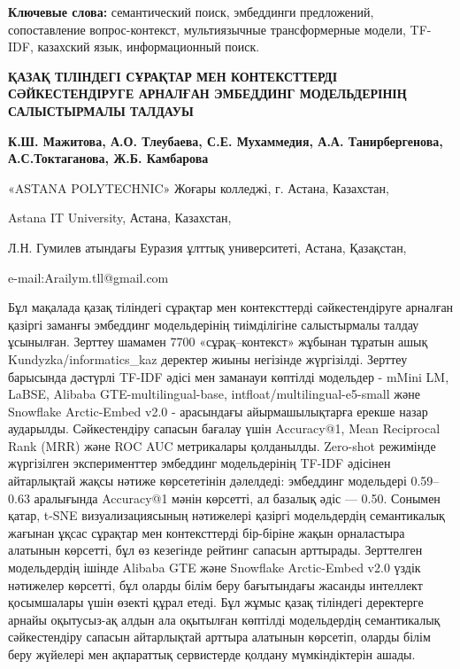{\bfseries Ключевые слова:} семантический поиск, эмбеддинги предложений,
сопоставление вопрос-кон\-текст, мультиязычные трансформерные модели,
TF-IDF, казахский язык, информационный поиск.

\begin{header}
{\bfseries ҚАЗАҚ ТІЛІНДЕГІ СҰРАҚТАР МЕН КОНТЕКСТТЕРДІ СӘЙКЕСТЕНДІРУГЕ АРНАЛҒАН ЭМБЕДДИНГ МОДЕЛЬДЕРІНІҢ САЛЫСТЫРМАЛЫ ТАЛДАУЫ}

{\bfseries
{}К.Ш. Мажитова\envelope,
А.О. Тлеубаева,
С.Е. Мухаммедия,
А.А. Танирбергенова,
А.С.Токтаганова,
Ж.Б. Камбарова
}
\end{header}

\begin{affil}
«ASTANA POLYTECHNIC» Жоғары колледжі, г. Астана, Казахстан,

Astana IT University, Астана, Казахстан,

Л.Н. Гумилев атындағы Еуразия ұлттық университеті, Астана, Қазақстан,

e-mail:Arailym.tll@gmail.com
\end{affil}

Бұл мақалада қазақ тіліндегі сұрақтар мен контексттерді сәйкестендіруге
арналған қазіргі заманғы эмбеддинг модельдерінің тиімділігіне
салыстырмалы талдау ұсынылған. Зерттеу шамамен 7700 «сұрақ--контекст»
жұбынан тұратын ашық Kundyzka/informatics\_kaz деректер жиыны негізінде
жүргізілді. Зерттеу барысында дәстүрлі TF-IDF әдісі мен заманауи
көптілді модельдер - mMini LM, LaBSE, Alibaba GTE-multilingual-base,
intfloat/multilingual-e5-small және Snowflake Arctic-Em\-bed v2.0 -
арасындағы айырмашылықтарға ерекше назар аударылды. Сәйкестендіру
сапасын бағалау үшін Accuracy@1, Mean Reciprocal Rank (MRR) және ROC AUC
метрикалары қолданылды. Zero-shot режимінде жүргізілген эксперименттер
эмбеддинг модельдерінің TF-IDF әдісінен айтарлықтай жақсы нәтиже
көрсететінін дәлелдеді: эмбеддинг модельдері 0.59--0.63 аралығында
Accu\-racy@1 мәнін көрсетті, ал базалық әдіс --- 0.50. Сонымен қатар,
t-SNE визуализациясының нәтижелері қазіргі модельдердің семантикалық
жағынан ұқсас сұрақтар мен контексттерді бір-біріне жақын орналастыра
алатынын көрсетті, бұл өз кезегінде рейтинг сапасын арттырады.
Зерттелген модельдердің ішінде Alibaba GTE және Snowflake Arctic-Embed
v2.0 үздік нәтижелер көрсетті, бұл оларды білім беру бағытындағы жасанды
интеллект қосымшалары үшін өзекті құрал етеді. Бұл жұмыс қазақ тіліндегі
деректерге арнайы оқытусыз-ақ алдын ала оқытылған көптілді модельдердің
семантикалық сәйкестендіру сапасын айтарлықтай арттыра алатынын
көрсетіп, оларды білім беру жүйелері мен ақпараттық сервистерде қолдану
мүмкіндіктерін ашады.

